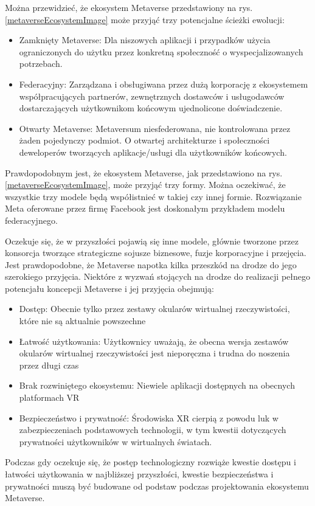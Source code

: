 Można przewidzieć, że ekosystem Metaverse przedstawiony na rys.\ref{metaverseEcosystemImage} może przyjąć trzy potencjalne ścieżki ewolucji:

\begin{itemize}
    \item Zamknięty Metaverse: Dla niszowych aplikacji i przypadków użycia ograniczonych do użytku przez konkretną społeczność o wyspecjalizowanych potrzebach.
    \item Federacyjny: Zarządzana i obsługiwana przez dużą korporację z ekosystemem współpracujących partnerów, zewnętrznych dostawców i usługodawców dostarczających użytkownikom końcowym ujednolicone doświadczenie.
    \item Otwarty Metaverse: Metaversum niesfederowana, nie kontrolowana przez żaden pojedynczy podmiot. O otwartej architekturze i społeczności deweloperów tworzących aplikacje/usługi dla użytkowników końcowych.
\end{itemize}



Prawdopodobnym jest, że ekosystem Metaverse, jak przedstawiono na rys.\ref{metaverseEcosystemImage}, może przyjąć trzy formy. Można oczekiwać, że wszystkie trzy modele będą współistnieć w takiej czy innej formie. Rozwiązanie Meta oferowane przez firmę Facebook jest doskonałym przykładem modelu federacyjnego\cite{metaverseSecurityIssuesChallengesAndViableZTAModel}. 

Oczekuje się, że w przyszłości pojawią się inne modele, głównie tworzone przez konsorcja tworzące strategiczne sojusze biznesowe, fuzje korporacyjne i przejęcia. Jest prawdopodobne, że Metaverse napotka kilka przeszkód na drodze do jego szerokiego przyjęcia. Niektóre z wyzwań stojących na drodze do realizacji pełnego potencjału koncepcji Metaverse i jej przyjęcia obejmują:

\begin{itemize}
    \item Dostęp: Obecnie tylko przez zestawy okularów wirtualnej rzeczywistości, które nie są aktualnie powszechne
    \item Łatwość użytkowania: Użytkownicy uważają, że obecna wersja zestawów okularów wirtualnej rzeczywistości jest nieporęczna i trudna do noszenia przez długi czas
    \item Brak rozwiniętego ekosystemu: Niewiele aplikacji dostępnych na obecnych platformach VR
    \item Bezpieczeństwo i prywatność: Środowiska XR cierpią z powodu luk w zabezpieczeniach podstawowych technologii, w tym kwestii dotyczących prywatności użytkowników w wirtualnych światach. 
\end{itemize}

Podczas gdy oczekuje się, że postęp technologiczny rozwiąże kwestie dostępu i łatwości użytkowania w najbliższej przyszłości, kwestie bezpieczeństwa i prywatności muszą być budowane od podstaw podczas projektowania ekosystemu Metaverse\cite{metaverseSecurityIssuesChallengesAndViableZTAModel}.
